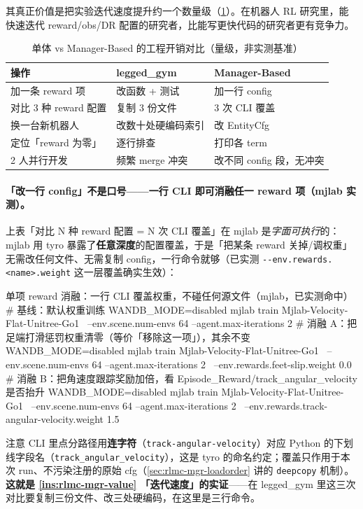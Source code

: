 \begin{insight}\label{ins:rlmc-mgr-value}
其真正价值是把实验迭代速度提升约一个数量级（\cref{tab:rlmc-mgr-speedup}）。在机器人 RL 研究里，能快速迭代 reward/obs/DR 配置的研究者，比能写更快代码的研究者更有竞争力。
\end{insight}

\begin{table}[ht]
\centering
\caption{单体 vs Manager-Based 的工程开销对比（量级，非实测基准）}
\label{tab:rlmc-mgr-speedup}
\small
\begin{tabular}{@{}lll@{}}
\toprule
操作 & legged\_gym & Manager-Based \\
\midrule
加一条 reward 项 & 改函数 + 测试 & 加一行 config \\
对比 3 种 reward 配置 & 复制 3 份文件 & 3 次 CLI 覆盖 \\
换一台新机器人 & 改数十处硬编码索引 & 改 EntityCfg \\
定位「reward 为零」 & 逐行排查 & 打印各 term \\
2 人并行开发 & 频繁 merge 冲突 & 改不同 config 段，无冲突 \\
\bottomrule
\end{tabular}
\end{table}

\paragraph{「改一行 config」不是口号——一行 CLI 即可消融任一 reward 项（mjlab 实测）。}上表「对比 N 种 reward 配置 = N 次 CLI 覆盖」在 mjlab 是\emph{字面可执行}的：mjlab 用 tyro 暴露了\textbf{任意深度}的配置覆盖，于是「把某条 reward 关掉/调权重」无需改任何文件、无需复制 config，一行命令就够（已实测 \verb|--env.rewards.<name>.weight| 这一层覆盖确实生效）：

\begin{codebox}[bash]{单项 reward 消融：一行 CLI 覆盖权重，不碰任何源文件（mjlab，已实测命中）}
# 基线：默认权重训练
WANDB_MODE=disabled mjlab train Mjlab-Velocity-Flat-Unitree-Go1 \
    --env.scene.num-envs 64 --agent.max-iterations 2
# 消融 A：把足端打滑惩罚权重清零（等价「移除这一项」），其余不变
WANDB_MODE=disabled mjlab train Mjlab-Velocity-Flat-Unitree-Go1 \
    --env.scene.num-envs 64 --agent.max-iterations 2 \
    --env.rewards.feet-slip.weight 0.0
# 消融 B：把角速度跟踪奖励加倍，看 Episode_Reward/track_angular_velocity 是否抬升
WANDB_MODE=disabled mjlab train Mjlab-Velocity-Flat-Unitree-Go1 \
    --env.scene.num-envs 64 --agent.max-iterations 2 \
    --env.rewards.track-angular-velocity.weight 1.5
\end{codebox}
\noindent 注意 CLI 里点分路径用\textbf{连字符}（\verb|track-angular-velocity|）对应 Python 的下划线字段名（\verb|track_angular_velocity|），这是 tyro 的命名约定；覆盖只作用于本次 run、不污染注册的原始 cfg（\cref{sec:rlmc-mgr-loadorder} 讲的 \verb|deepcopy| 机制）。\textbf{这就是 \cref{ins:rlmc-mgr-value} 「迭代速度」的实证}——在 legged\_gym 里这三次对比要复制三份文件、改三处硬编码，在这里是三行命令。

